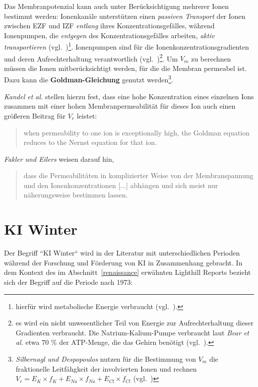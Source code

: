 Das Membranpotenzial kann auch unter Berücksichtigung mehrerer Ionen bestimmt werden: Ionenkanäle unterstützen einen \textit{passiven Transport} der Ionen zwischen EZF und IZF \textit{entlang} ihres Konzentrationsgefälles, während Ionenpumpen, die \textit{entgegen} des Konzentrationsgefälles arbeiten, \textit{aktiv transportieren} (vgl.~\cite[30]{Fro19})\footnote{
    hierfür wird metabolische Energie verbraucht (vgl.~\cite[31]{Fro19}).
}.
Ionenpumpen sind für die Ionenkonzentrationsgradienten und deren Aufrechterhaltung verantwortlich (vgl.~\cite[76]{BCP18})\footnote{
    es wird ein nicht unwesentlicher Teil von Energie zur Aufrechterhaltung dieser Gradienten verbraucht. Die Natrium-Kalium-Pumpe verbraucht laut \textit{Bear et al.} etwa $70$ \% der ATP-Menge, die das Gehirn benötigt (vgl.~\cite[76]{BCP18}).
}.
Um $V_m$ zu berechnen müssen die Ionen mitberücksichtigt werden, für die die Membran permeabel ist.
Dazu kann die \textbf{Goldman-Gleichung} genutzt werden\footnote{
    \textit{Silbernagl und Despopoulos} nutzen für die Bestimmung von $V_m$ die fraktionelle Leitfähgkeit der involvierten Ionen und rechnen $V_r = E_K \times f_K + E_{Na}  \times f_{Na} + E_{Cl}  \times f_{Cl}$ (vgl.~\cite[32, 1.21]{SD07})
}.

\textit{Kandel et al.} stellen hierzu fest, dass eine hohe Konzentration eines einzelnen Ions zusammen mit einer hohen Membranpermeabilität für dieses Ion auch einen größeren Beitrag für $V_r$ leistet:

\blockquote[{\cite[135]{KSJ+13}}]{
    when permeability to one ion is exceptionally high, the Goldman equation reduces to the Nernst equation for that ion.
}

\noindent
\textit{Fakler und Eilers} weisen darauf hin,

\blockquote[{\cite[67]{FE19}}]{
    dass die Permeabilitäten in komplizierter Weise von der Membranspannung und den Ionenkonzentrationen {[...]} abhängen und sich meist nur näherungsweise bestimmen lassen.
}


\section{KI Winter}\label{appendix:kiwinter}

Der Begriff ``KI Winter`` wird in der Literatur mit unterschiedlichen Perioden während der Forschung und Förderung von KI in Zusammenhang gebracht.
In dem Kontext des im Abschnitt~\ref{renaissance} erwähnten Lighthill Reports bezieht sich der Begriff auf die Periode nach 1973:

